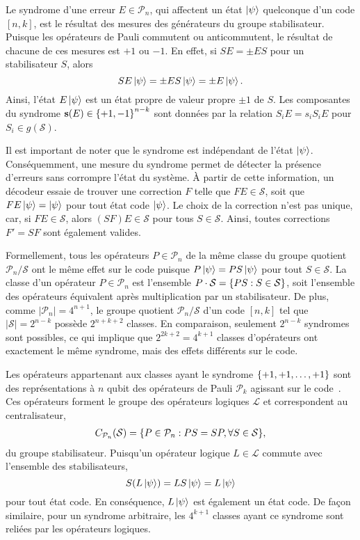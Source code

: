 Le syndrome d'une erreur $E \in \mathcal P_n$,
qui affectent un état $\ket\psi$ quelconque d'un code $[n, k]$,
est le résultat des mesures des générateurs du groupe stabilisateur.
Puisque les opérateurs de Pauli commutent ou anticommutent,
le résultat de chacune de ces mesures est $+1$ ou $-1$.
En effet, si $SE = \pm ES$ pour un stabilisateur $S$,
alors
\begin{equation}
  SE\ket\psi = \pm E S \ket\psi = \pm E\ket\psi.
\end{equation}
Ainsi,
l'état $E\ket\psi$ est un état propre de valeur propre $\pm 1$ de $S$.
Les composantes du syndrome $\vb{s}(E) \in \qty{+1, -1}^{n - k}$
sont données par la relation $S_iE = s_i S_i E$ pour $S_i \in g(\mathcal S)$.

Il est important de noter que le syndrome est indépendant de l'état $\ket \psi$.
Conséquemment,
une mesure du syndrome permet de détecter la présence d'erreurs sans corrompre l'état du système.
À partir de cette information,
un décodeur essaie de trouver une correction $F$ telle que $FE \in \mathcal S$, 
soit que $FE\ket\psi = \ket\psi$ pour tout état code $\ket\psi$.
Le choix de la correction n'est pas unique, car, si $FE \in \mathcal S$,
alors $(SF)E \in \mathcal S$ pour tous $S \in \mathcal S$.
Ainsi,
toutes corrections $F' = SF$ sont également valides.

Formellement,
tous les opérateurs $P \in \mathcal P_n$ de la même classe du groupe quotient $\mathcal P_n/\mathcal S$
ont le même effet sur le code puisque $P\ket\psi = PS\ket\psi$ pour tout $S \in \mathcal S$.
La classe d'un opérateur $P \in \mathcal P_n$ est l'ensemble $P\cdot \mathcal S = \qty{PS : S\in \mathcal S}$,
soit l'ensemble des opérateurs équivalent après multiplication par un stabilisateur.
De plus,
comme $|\mathcal P_n| = 4^{n+1}$,
le groupe quotient $\mathcal P_n/\mathcal S$ d'un code $[n, k]$ tel que $|\mathcal S| = 2^{n - k}$
possède $2^{n+k+2}$ classes.
En comparaison,
seulement $2^{n-k}$ syndromes sont possibles,
ce qui implique que $2^{2k + 2} = 4^{k + 1}$ classes d'opérateurs ont exactement le même syndrome,
mais des effets différents sur le code.

Les opérateurs appartenant aux classes ayant le syndrome $\qty{+1, +1, \ldots, +1}$
sont des représentations à $n$ qubit des opérateurs de Pauli $\mathcal P_k$
agissant sur le code~\cite{aaronson_improved_2004}.
Ces opérateurs forment le groupe des opérateurs logiques $\mathcal L$ et correspondent
au centralisateur,
\begin{align}
  C_{\mathcal P_n}(\mathcal S) 
  = \qty{P \in \mathcal P_n : PS = SP, \forall S \in \mathcal S},
\end{align}
du groupe stabilisateur.
Puisqu'un opérateur logique $L \in \mathcal L$ commute avec l'ensemble des stabilisateurs,
\begin{equation}
  S(L\ket\psi) = LS\ket\psi = L\ket\psi
\end{equation}
pour tout état code.
En conséquence,
$L\ket\psi$ est également un état code.
De façon similaire,
pour un syndrome arbitraire,
les $4^{k+1}$ classes ayant ce syndrome sont reliées par les opérateurs logiques.

